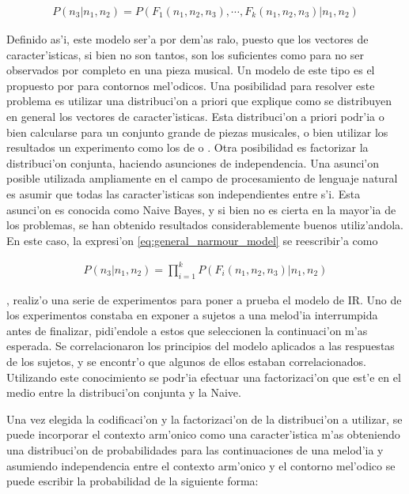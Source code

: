 \begin{align}
\label{eq:general_narmour_model}
P(n_3 | n_1, n_2) = P(F_1(n_1, n_2, n_3), \cdots, F_k(n_1, n_2, n_3)|n_1, n_2)
\end{align}

Definido as'i, este modelo ser'a por dem'as ralo, puesto que los vectores de caracter'isticas, si bien no son tantos, son los suficientes como para no ser observados
por completo en una pieza musical. Un modelo de este tipo es el propuesto por \cite{PaieThesis} para contornos mel'odicos. Una posibilidad para resolver este problema es utilizar una distribuci'on a priori que explique como se distribuyen en general
los vectores de caracter'isticas. Esta distribuci'on a priori podr'ia o bien calcularse para un conjunto grande de piezas musicales, o bien utilizar los resultados 
un experimento como los de \cite{Krumhansl95} o \cite{Schellenberg96}. 
Otra posibilidad es factorizar la distribuci'on conjunta, haciendo asunciones de independencia. Una asunci'on posible utilizada ampliamente en el campo 
de procesamiento de lenguaje natural es asumir que todas las caracter'isticas son independientes entre s'i. Esta asunci'on es conocida como Naive Bayes, y
si bien no es cierta en la mayor'ia de los problemas, se han obtenido resultados considerablemente buenos utiliz'andola. 
En este caso, la expresi'on \ref{eq:general_narmour_model} se reescribir'a como

\begin{align}
\label{eq:naive_bayes_narmour_model}
P(n_3 | n_1, n_2) = \prod_{i=1}^k P(F_i(n_1, n_2, n_3)|n_1, n_2)
\end{align}

\cite{Schellenberg96}, realiz'o una serie de experimentos para poner a prueba el modelo de IR. Uno de los experimentos constaba en exponer a 
sujetos a una melod'ia interrumpida antes de finalizar, pidi'endole a estos que seleccionen la continuaci'on m'as esperada.
Se correlacionaron los principios del modelo aplicados a las respuestas de los sujetos, 
y se encontr'o que algunos de ellos estaban correlacionados. Utilizando este conocimiento se podr'ia efectuar una factorizaci'on que est'e en el medio entre 
la distribuci'on conjunta y la Naive.

Una vez elegida la codificaci'on y la factorizaci'on de la distribuci'on a utilizar, se puede incorporar el contexto arm'onico como una caracter'istica m'as 
obteniendo una distribuci'on de probabilidades para las continuaciones de una melod'ia y asumiendo independencia entre el contexto arm'onico y el contorno mel'odico
se puede escribir la probabilidad de la siguiente forma:

